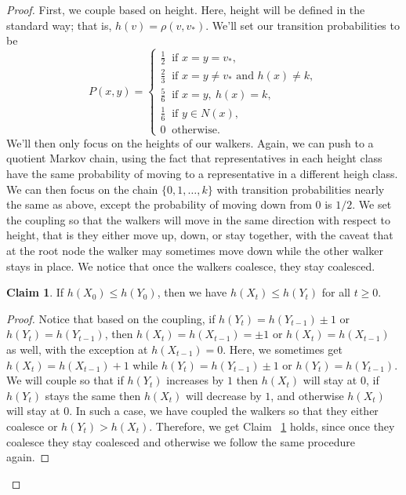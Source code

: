 \documentclass[10pt,a4paper]{amsart}
\theoremstyle{definition}
\numberwithin{definition}{section}
\newtheorem{claim}[definition]{Claim}
\begin{document}
\begin{proof}
First, we couple based on height. Here, height will be defined in the standard way; that is, $h(v) = \rho(v, v_*)$. We'll set our transition probabilities to be 
\[ P(x,y) = \begin{cases} \frac{1}{2} \ \text{ if } x = y = v_*, \\ 
\frac{2}{3} \ \text{ if } x = y \neq v_* \text{ and } h(x) \neq k, \\
\frac{5}{6} \ \text{ if } x = y, \ h(x) = k, \\
\frac{1}{6} \ \text{ if } y \in N(x), \\
0 \ \text{ otherwise.}
\end{cases}\]
We'll then only focus on the heights of our walkers. Again, we can push to a quotient Markov chain, using the fact that representatives in each height class have the same probability of moving to a representative in a different heigh class. We can then focus on the chain $\{0, 1, \ldots, k\}$ with transition probabilities nearly the same as above, except the probability of moving down from $0$ is $1/2$. We set the coupling so that the walkers will move in the same direction with respect to height, that is they either move up, down, or stay together, with the caveat that at the root node the walker may sometimes move down while the other walker stays in place. We notice that once the walkers coalesce, they stay coalesced. 

\begin{claim}\label{claim:ajani}
If $h(X_0) \leq h(Y_0)$, then we have $h(X_t) \leq h(Y_t)$ for all $t \geq 0$.
\end{claim}

\begin{proof}
Notice that based on the coupling, if $h(Y_t) = h(Y_{t-1}) \pm 1$ or $h(Y_t) = h(Y_{t-1})$, then $h(X_{t}) = h(X_{t-1}) = \pm 1$ or $h(X_t) = h(X_{t-1})$ as well, with the exception at $h(X_{t-1}) = 0$. Here, we sometimes get $h(X_{t}) = h(X_{t-1}) + 1$ while $h(Y_t) = h(Y_{t-1}) \pm 1$ or $h(Y_t) = h(Y_{t-1})$. We will couple so that if $h(Y_t)$ increases by $1$ then $h(X_t)$ will stay at $0$, if $h(Y_t)$ stays the same then $h(X_t)$ will decrease by $1$, and otherwise $h(X_t)$ will stay at $0$. In such a case, we have coupled the walkers so that they either coalesce or $h(Y_t) > h(X_t)$. Therefore, we get Claim ~\ref{claim:ajani} holds, since once they coalesce they stay coalesced and otherwise we follow the same procedure again.
\end{proof}


\end{proof}
\end{document}
